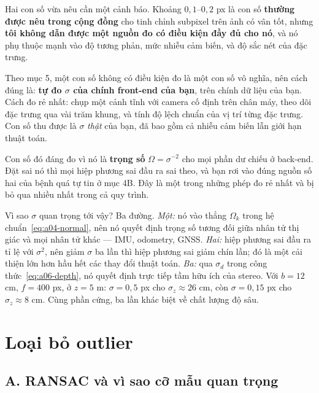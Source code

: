 \documentclass[../../vslam.tex]{subfiles}
\begin{document}
\begin{cambay}
Hai con số vừa nêu cần một cảnh báo. Khoảng \(0{,}1\)--\(0{,}2\) px là con số \textbf{thường được nêu trong cộng đồng} cho tinh chỉnh subpixel trên ảnh có vân tốt, nhưng \textbf{tôi không dẫn được một nguồn đo có điều kiện đầy đủ cho nó}, và nó phụ thuộc mạnh vào độ tương phản, mức nhiễu cảm biến, và độ sắc nét của đặc trưng.

Theo  mục 5, một con số không có điều kiện đo là một con số vô nghĩa, nên cách đúng là: \textbf{tự đo \(\sigma\) của chính front-end của bạn}, trên chính dữ liệu của bạn. Cách đo rẻ nhất: chụp một cảnh tĩnh với camera cố định trên chân máy, theo dõi đặc trưng qua vài trăm khung, và tính độ lệch chuẩn của vị trí từng đặc trưng. Con số thu được là \(\sigma\) \emph{thật} của bạn, đã bao gồm cả nhiễu cảm biến lẫn giới hạn thuật toán.

Con số đó đáng đo vì nó là \textbf{trọng số} \(\Omega = \sigma^{-2}\) cho mọi phần dư chiếu ở back-end. Đặt sai nó thì mọi hiệp phương sai đầu ra sai theo, và bạn rơi vào đúng nguồn số hai của bệnh quá tự tin ở  mục 4B. Đây là một trong những phép đo rẻ nhất và bị bỏ qua nhiều nhất trong cả quy trình.
\end{cambay}

Vì sao \(\sigma\) quan trọng tới vậy? Ba đường. \emph{Một:} nó vào thẳng \(\Omega_k\) trong hệ chuẩn~\eqref{eq:a04-normal}, nên nó quyết định trọng số tương đối giữa nhân tử thị giác và mọi nhân tử khác --- IMU, odometry, GNSS. \emph{Hai:} hiệp phương sai đầu ra tỉ lệ với \(\sigma^2\), nên giảm \(\sigma\) ba lần thì hiệp phương sai giảm chín lần; đó là một cải thiện lớn hơn hầu hết các thay đổi thuật toán. \emph{Ba:} qua \(\sigma_d\) trong công thức~\eqref{eq:a06-depth}, nó quyết định trực tiếp tầm hữu ích của stereo. Với \(b=12\) cm, \(f=400\) px, ở \(z=5\) m: \(\sigma = 0{,}5\) px cho \(\sigma_z \approx 26\) cm, còn \(\sigma = 0{,}15\) px cho \(\sigma_z \approx 8\) cm. Cùng phần cứng, ba lần khác biệt về chất lượng độ sâu.

\section{Loại bỏ outlier}

\subsection{A. RANSAC và vì sao cỡ mẫu quan trọng}
\end{document}
